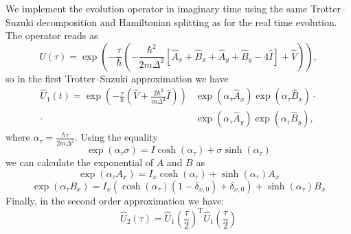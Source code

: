 We implement the evolution operator in imaginary time using the same Trotter--Suzuki decomposition and Hamiltonian splitting as for the real time evolution. The operator reads as
\begin{equation}
\hat{U}(\tau) =   \exp\left(-\frac{\tau}{\hbar} \left( -\frac{\hbar^2}{2 m \Delta^2} \left[ \hat{A}_x + \hat{B}_x + \hat{A}_y + \hat{B}_y - 4 \hat{I} \right] + \hat{V} \right) \right),
\end{equation} 
so in the first Trotter--Suzuki approximation we have
\begin{align}
\hat{U}_1(t) = \exp\left(-\frac{\tau}{\hbar}\left(\hat{V} + \frac{2 \hbar^2}{m \Delta^2} \hat{I}\right) \right) & \exp\left(\alpha_\tau \hat{A}_x \right) \exp\left( \alpha_\tau \hat{B}_x \right) \cdot \\ \cdot & \exp\left( \alpha_\tau \hat{A}_y \right) \exp\left( \alpha_\tau \hat{B}_y \right), \nonumber
\end{align}
where $\alpha_\tau = \frac{\hbar \tau}{2m\Delta^2}$. Using the equality
\begin{equation}
\exp( \alpha_\tau \sigma) = I \cosh(\alpha_\tau) +  \sigma \sinh(\alpha_\tau)
\end{equation}
we can calculate the exponential of $A$ and $B$ as
\begin{equation}
\exp\left( \alpha_\tau A_x \right) = I_x \cosh(\alpha_\tau) + \sinh(\alpha_\tau) A_x
\end{equation}
\begin{equation}
\exp\left( \alpha_\tau B_x \right) = I_x (\cosh(\alpha_\tau)(1-\delta_{x,0}) + \delta_{x,0}) +  \sinh(\alpha_\tau) B_x
\end{equation}
Finally, in the second order approximation we have:
\begin{equation}
\hat{U}_2(\tau) = \hat{U}_1\left( \frac{\tau}{2} \right)^\mathrm{T} \hat{U}_1\left(\frac{\tau}{2}\right)
\end{equation}

